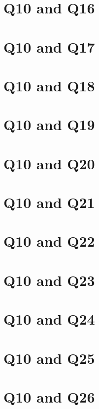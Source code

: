 \documentclass{report}
\begin{document}
\clearpage
\section{Q10 and Q16}


\clearpage
\section{Q10 and Q17}


\clearpage
\section{Q10 and Q18}


\clearpage
\section{Q10 and Q19}


\clearpage
\section{Q10 and Q20}


\clearpage
\section{Q10 and Q21}


\clearpage
\section{Q10 and Q22}


\clearpage
\section{Q10 and Q23}


\clearpage
\section{Q10 and Q24}


\clearpage
\section{Q10 and Q25}


\clearpage
\section{Q10 and Q26}

\end{document}
